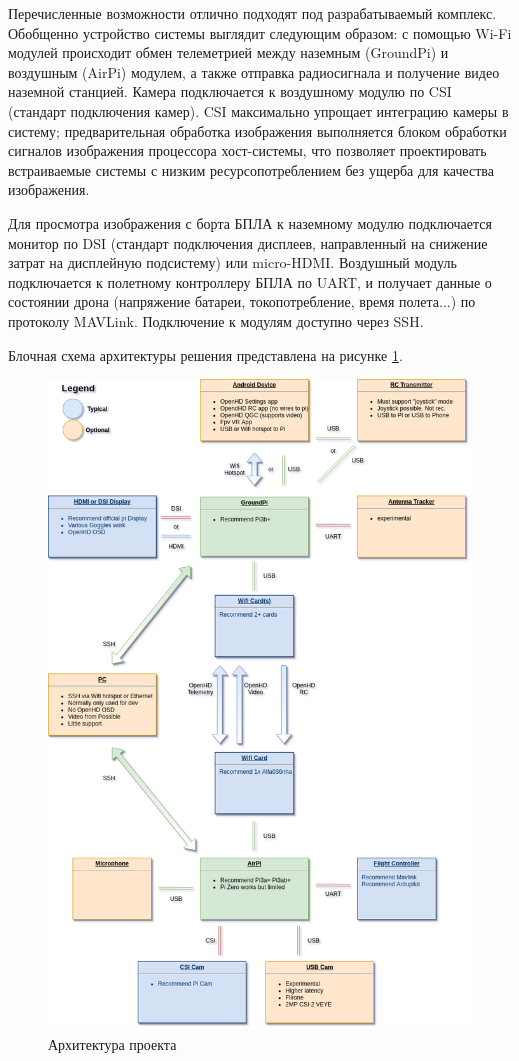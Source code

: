 Перечисленные возможности отлично подходят под разрабатываемый комплекс.
Обобщенно устройство системы выглядит следующим образом: с помощью Wi-Fi модулей происходит обмен телеметрией между наземным (Ground\-Pi) и воздушным (AirPi) модулем, а также отправка радиосигнала и получение видео наземной станцией. Камера подключается к воздушному модулю по CSI (стандарт подключения камер). CSI максимально упрощает интеграцию камеры в систему; предварительная обработка изображения выполняется блоком обработки сигналов изображения процессора хост-системы, что позволяет проектировать встраиваемые системы с низким ресурсопотреблением без ущерба для качества изображения.

Для просмотра изображения с борта БПЛА к наземному модулю подключается монитор по DSI (стандарт подключения дисплеев, направленный на снижение затрат на дисплейную подсистему) или micro-HDMI. Воздушный модуль подключается к полетному контроллеру БПЛА по UART, и получает данные о состоянии дрона (напряжение батареи, токопотребление, время полета...) по протоколу MAVLink. Подключение к модулям доступно через SSH.

Блочная схема архитектуры решения представлена на рисунке \ref{fig:OpenHDSetup}.

\begin{figure}[H]
	\centering
	\includegraphics[width=0.8\linewidth]{pics/OpenHDSetup}
	\caption{ Архитектура проекта
	}
	\label{fig:OpenHDSetup}
\end{figure}

